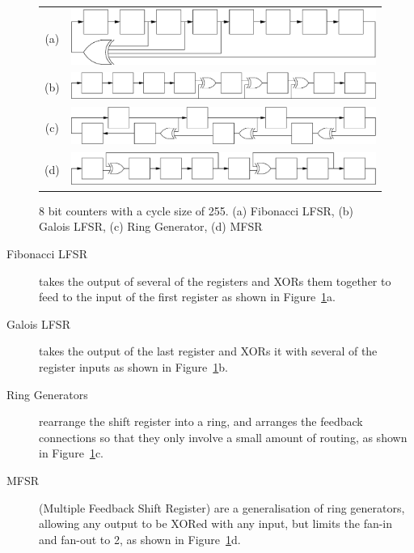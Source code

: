 \documentclass[5p, twocolumn]{elsarticle}
\begin{document}
\begin{figure}
\begin{center}
\begin{tabular}{c V}
(a) & \includegraphics[width=0.9\linewidth]{images/lfsrf.eps} \\
(b) & \includegraphics[width=\linewidth]{images/lfsrg.eps} \\
(c) & \includegraphics[width=\linewidth]{images/ring_gen.eps} \\
(d) & \includegraphics[width=\linewidth]{images/mfsr.eps} \\
\end{tabular}
\caption{8 bit counters with a cycle size of 255. (a) Fibonacci LFSR, (b)
Galois LFSR, (c) Ring Generator, (d) MFSR}
\label{fsr8_figure}
\end{center}
\end{figure}


\begin{description}
\item[Fibonacci LFSR] takes the output of several of the registers and XORs them together to feed to the input of the first register as shown in Figure~\ref{fsr8_figure}a.
\item[Galois LFSR] takes the output of the last register and XORs it with several of the register inputs as shown in Figure~\ref{fsr8_figure}b. 
\item[Ring Generators~\cite{high_performance_ring_generators}] rearrange the shift register into a ring, and arranges the feedback connections so that they only involve a small amount of routing, as shown in Figure~\ref{fsr8_figure}c.
\item[MFSR~\cite{MFSR_List}] (Multiple Feedback Shift Register) are a generalisation of ring generators, allowing any output to be XORed with any input, but limits the fan-in and fan-out to 2, as shown in Figure~\ref{fsr8_figure}d.
\end{description}
\end{document}
